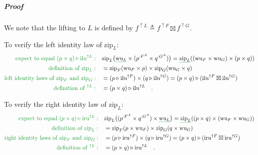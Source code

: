 \subparagraph{Proof}

We note that the lifting to $L$ is defined by $f^{\uparrow L}\triangleq f^{\uparrow F}\boxtimes f^{\uparrow G}$.

To verify the left identity law of $\text{zip}_{L}$:
\begin{align*}
{\color{greenunder}\text{expect to equal }(p\times q)\triangleright\text{ilu}^{\uparrow L}:}\quad & \text{zip}_{L}\big(\gunderline{\text{wu}_{L}}\times(p^{:F^{A}}\times q^{:G^{A}})\big)=\gunderline{\text{zip}_{L}}((\text{wu}_{F}\times\text{wu}_{G})\times(p\times q))\\
{\color{greenunder}\text{definition of }\text{zip}_{L}:}\quad & =\text{zip}_{F}(\text{wu}_{F}\times p)\times\text{zip}_{G}(\text{wu}_{G}\times q)\\
{\color{greenunder}\text{left identity laws of }\text{zip}_{F}\text{ and }\text{zip}_{G}:}\quad & =(p\triangleright\text{ilu}^{\uparrow F})\times(q\triangleright\text{ilu}^{\uparrow G})=(p\times q)\triangleright(\text{ilu}^{\uparrow F}\boxtimes\text{ilu}^{\uparrow G})\\
{\color{greenunder}\text{definition of }^{\uparrow L}:}\quad & =(p\times q)\triangleright\text{ilu}^{\uparrow L}\quad.
\end{align*}

To verify the right identity law of $\text{zip}_{L}$:
\begin{align*}
{\color{greenunder}\text{expect to equal }(p\times q)\triangleright\text{iru}^{\uparrow L}:}\quad & \text{zip}_{L}\big((p^{:F^{A}}\times q^{:G^{A}})\times\gunderline{\text{wu}_{L}}\big)=\gunderline{\text{zip}_{L}}((p\times q)\times(\text{wu}_{F}\times\text{wu}_{G}))\\
{\color{greenunder}\text{definition of }\text{zip}_{L}:}\quad & =\text{zip}_{F}(p\times\text{wu}_{F})\times\text{zip}_{G}(q\times\text{wu}_{G})\\
{\color{greenunder}\text{right identity laws of }\text{zip}_{F}\text{ and }\text{zip}_{G}:}\quad & =(p\triangleright\text{iru}^{\uparrow F})\times(q\triangleright\text{iru}^{\uparrow G})=(p\times q)\triangleright(\text{iru}^{\uparrow F}\boxtimes\text{iru}^{\uparrow G})\\
{\color{greenunder}\text{definition of }^{\uparrow L}:}\quad & =(p\times q)\triangleright\text{iru}^{\uparrow L}\quad.
\end{align*}

